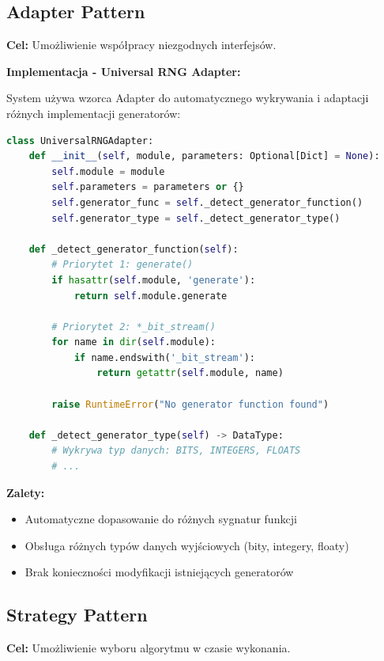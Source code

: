 \documentclass[12pt,a4paper]{article}
\begin{document}
\newpage

\subsection{Adapter Pattern}

\textbf{Cel:} Umożliwienie współpracy niezgodnych interfejsów.

\textbf{Implementacja - Universal RNG Adapter:}

System używa wzorca Adapter do automatycznego wykrywania i adaptacji różnych implementacji generatorów:

\begin{lstlisting}[language=Python, caption=Universal RNG Adapter]
class UniversalRNGAdapter:
    def __init__(self, module, parameters: Optional[Dict] = None):
        self.module = module
        self.parameters = parameters or {}
        self.generator_func = self._detect_generator_function()
        self.generator_type = self._detect_generator_type()
    
    def _detect_generator_function(self):
        # Priorytet 1: generate()
        if hasattr(self.module, 'generate'):
            return self.module.generate
        
        # Priorytet 2: *_bit_stream()
        for name in dir(self.module):
            if name.endswith('_bit_stream'):
                return getattr(self.module, name)
        
        raise RuntimeError("No generator function found")
    
    def _detect_generator_type(self) -> DataType:
        # Wykrywa typ danych: BITS, INTEGERS, FLOATS
        # ...
\end{lstlisting}

\textbf{Zalety:}
\begin{itemize}
    \item Automatyczne dopasowanie do różnych sygnatur funkcji
    \item Obsługa różnych typów danych wyjściowych (bity, integery, floaty)
    \item Brak konieczności modyfikacji istniejących generatorów
\end{itemize}

\subsection{Strategy Pattern}

\textbf{Cel:} Umożliwienie wyboru algorytmu w czasie wykonania.
\end{document}

